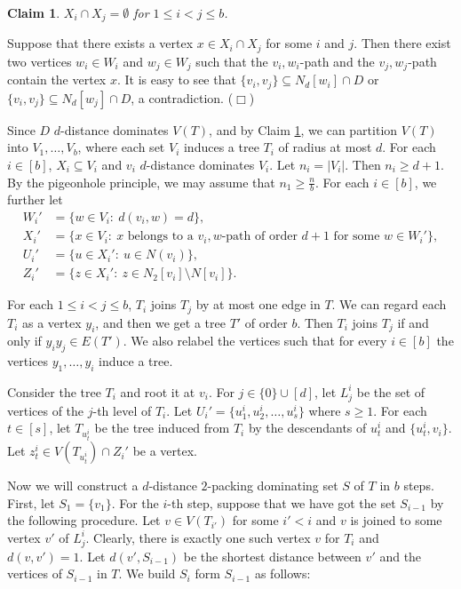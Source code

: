 \documentclass[12pt]{article}
\newtheorem{claim}{Claim}
\newcommand{\smallqed}{{\tiny ($\Box$)}}
\begin{document}
    \begin{claim}
        \label{claim:disjoint}
	$X_i \cap X_j =\emptyset$ for $1 \leq i < j \leq b$.
    \end{claim}
	
    \proof
         Suppose that there exists a vertex $x \in X_i \cap X_j$ for some $i$ and $j$. Then there exist two vertices $w_i \in W_i$ and $w_j \in W_j$ such that the $v_i,w_i$-path and the $v_j,w_j$-path contain the vertex $x$. It is easy to see that $\{v_i,v_j\} \subseteq N_d[w_i] \cap D$ or $\{v_i,v_j\} \subseteq N_d[w_j] \cap D$, a contradiction.
    \smallqed
\medskip

    Since $D$ $d$-distance dominates $V(T)$, and by Claim \ref{claim:disjoint}, we can partition $V(T)$ into $V_1,\dots,V_b$, where each set $V_i$ induces a tree $T_i$ of radius at most $d$. For each $i \in [b]$, $X_i \subseteq V_i$ and $v_i$ $d$-distance dominates $V_i$. Let $n_i=|V_i|$. Then $n_i \geq d+1$. By the pigeonhole principle, we may assume that $n_1 \geq \frac{n}{b}$. For each $i \in [b]$, we further let 
    \begin{align*}
        W_i' & =  \{w \in V_i:\ d(v_i,w)=d\}, \\
        X_i' & = \{x \in V_i:\ x \text{~belongs to a~} v_i,w\text{-path of order~} d+1 \text{~for some~} w \in W_i'\}, \\
        U_i' &  = \{u \in X_i':\ u \in N(v_i)\}, \\
        Z_i' &  = \{z \in X_i':\ z \in N_2[v_i]\setminus N[v_i]\}.
    \end{align*}

    For each $1 \leq i < j \leq b$, $T_i$ joins $T_j$ by at most one edge in $T$. We can regard each $T_i$ as a vertex $y_i$, and then we get a tree $T'$ of order $b$. Then $T_i$ joins $T_j$ if and only if $y_iy_j \in E(T')$. We also relabel the vertices such that for every $i\in [b]$ the vertices $y_1, \ldots, y_i$ induce a tree.
    
    Consider the tree $T_i$ and root it at $v_i$. For $j \in \{0\} \cup [d]$, let $L_j^i$ be the set of vertices of the $j$-th level of $T_i$. Let $U_i'=\{u_1^i,u_2^i,\dots,u_s^i\}$ where $s \geq 1$. For each $t \in [s]$, let $T_{u_t^i}$ be the tree induced from $T_i$ by the descendants of $u_t^i$ and $\{u_t^i,v_i\}$. Let $z_t^i \in V(T_{u_t^i}) \cap Z_i'$ be a vertex.
    
    Now we will construct a $d$-distance $2$-packing dominating set $S$ of $T$ in $b$ steps. First, let $S_1=\{v_1\}$. For the $i$-th step, suppose that we have got the set $S_{i-1}$ by the following procedure. Let $v \in V(T_{i'})$ for some $i' < i$ and $v$ is joined to some vertex $v'$ of $L_{j}^{i}$. Clearly, there is exactly one such vertex $v$ for $T_i$ and $d(v,v')=1$. Let $d(v',S_{i-1})$ be the shortest distance between $v'$ and the vertices of $S_{i-1}$ in $T$. We build $S_i$ form $S_{i-1}$ as follows:
\end{document}
